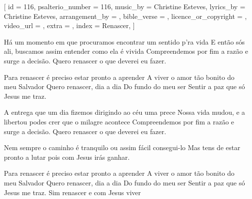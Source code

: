 
[
    id                     = {116},
    psalterio_number       = {116},
    music_by               = {Christine Esteves},
    lyrics_by              = {Christine Esteves},
    arrangement_by         = {},
    bible_verse            = {},
    licence_or_copyright   = {},
    video_url              = {},
    extra                  = {},
    index                  = {Renascer},
]


\beginverse
Há um momento em que procuramos encontrar um sentido p’ra vida
E então sós ali, buscamos assim entender como ela é vivida
Compreendemos por fim a razão e surge a decisão.
Quero renascer o que deverei eu fazer.
\endverse


\beginchorus
Para renascer é preciso estar pronto a aprender
A viver o amor tão bonito do meu Salvador
Quero renascer, dia a dia
Do fundo do meu ser
Sentir a paz que só Jesus me traz.
\endchorus


\beginverse
A entrega que um dia fizemos dirigindo ao céu uma prece
Nossa vida mudou, e a libertou podes crer que o milagre acontece 
Compreendemos por fim a razão e surge a decisão.
Quero renascer o que deverei eu fazer.

Nem sempre o caminho é tranquilo ou assim fácil consegui-lo
Mas tens de estar pronto a lutar pois com Jesus irás ganhar.
\endverse



\beginchorus
Para renascer é preciso estar pronto a aprender
A viver o amor tão bonito do meu Salvador
Quero renascer, dia a dia
Do fundo do meu ser
Sentir a paz que só Jesus me traz.
Sim renascer e com Jesus viver
\endchorus



\endsong
